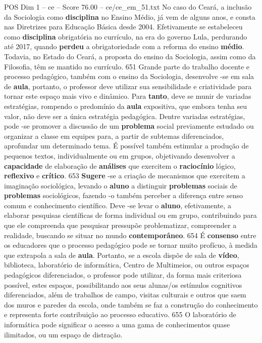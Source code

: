 \begin{textsample}{POS Dim 1 – ce – Score 76.00 – ce/ce\_em\_51.txt}
No caso do Ceará, a inclusão da Sociologia como \textbf{disciplina} no Ensino Médio, já vem de alguns anos, e consta nas Diretrizes para Educação Básica desde 2004.
Efetivamente se estabeleceu como \textbf{disciplina} obrigatória no currículo, na era do governo Lula, perdurando até 2017, quando \textbf{perdeu} a obrigatoriedade com a reforma do ensino \textbf{médio}.
Todavia, no Estado do Ceará, a proposta do ensino da Sociologia, assim como da Filosofia, têm se mantido no currículo. 651 Grande parte do trabalho docente e processo pedagógico, também com o ensino da Sociologia, desenvolve -se em sala de \textbf{aula}, portanto, o professor deve utilizar sua sensibilidade e criatividade para tornar este espaço mais vivo e dinâmico.
Para \textbf{tanto}, deve se munir de variadas estratégias, rompendo o predomínio da \textbf{aula} expositiva, que embora tenha seu valor, não deve ser a única estratégia pedagógica.
Dentre variadas estratégias, pode -se promover a discussão de um \textbf{problema} social previamente estudado ou organizar a classe em equipes para, a partir de subtemas diferenciados, aprofundar um determinado tema.
É possível também estimular a produção de pequenos textos, individualmente ou em grupos, objetivando desenvolver a \textbf{capacidade} de elaboração de \textbf{análises} que exercitem o \textbf{raciocínio} lógico, \textbf{reflexivo} e \textbf{crítico}. 653 \textbf{Sugere} -se a criação de mecanismos que exercitem a imaginação sociológica, levando o \textbf{aluno} a distinguir \textbf{problemas} sociais de \textbf{problemas} sociológicos, fazendo -o também perceber a diferença entre senso comum e conhecimento científico.
Deve -se levar o \textbf{aluno}, efetivamente, a elaborar pesquisas científicas de forma individual ou em grupo, contribuindo para que ele compreenda que pesquisar pressupõe problematizar, compreender a realidade, buscando se situar no mundo \textbf{contemporâneo}. 654 É \textbf{consenso} entre os educadores que o processo pedagógico pode se tornar muito profícuo, à medida que extrapola a sala de \textbf{aula}.
Portanto, se a escola dispõe de sala de \textbf{vídeo}, biblioteca, laboratório de informática, Centro de Multimeios, ou outros espaços pedagógicos diferenciados, o professor pode utilizar, da forma mais criteriosa possível, estes espaços, possibilitando aos seus alunas/os estímulos cognitivos diferenciados, além de trabalhos de campo, visitas culturais e outros que saem dos muros e paredes da escola, onde também se faz a construção do conhecimento e representa forte contribuição ao processo educativo. 655 O laboratório de informática pode significar o acesso a uma gama de conhecimentos quase ilimitados, ou um espaço de distração.

\end{textsample}
